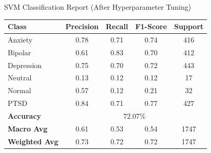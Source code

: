 \begin{center}
\vspace{0.25in}

\caption{SVM Classification Report (After Hyperparameter Tuning)}
\begin{tabular}{|l|c|c|c|c|}
\hline
\textbf{Class} & \textbf{Precision} & \textbf{Recall} & \textbf{F1-Score} & \textbf{Support} \\ \hline
Anxiety        & 0.78               & 0.71            & 0.74              & 416              \\ \hline
Bipolar        & 0.61               & 0.83            & 0.70              & 412              \\ \hline
Depression     & 0.75               & 0.70            & 0.72              & 443              \\ \hline
Neutral        & 0.13               & 0.12            & 0.12              & 17               \\ \hline
Normal         & 0.57               & 0.12            & 0.21              & 32               \\ \hline
PTSD           & 0.84               & 0.71            & 0.77              & 427              \\ \hline
\textbf{Accuracy} & \multicolumn{4}{|c|}{72.07\%} \\ \hline
\textbf{Macro Avg} & 0.61            & 0.53            & 0.54              & 1747             \\ \hline
\textbf{Weighted Avg} & 0.73         & 0.72            & 0.72              & 1747             \\ \hline
\end{tabular}

\vspace{0.25in}


\end{center}
